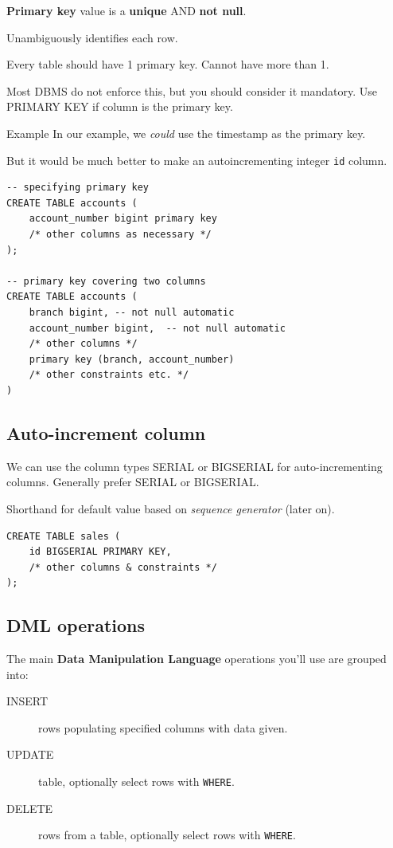 \documentclass[slides]{pgnotes}
\begin{document}
\textbf{Primary key} value is a \textbf{unique} AND \textbf{not null}.

Unambiguously identifies each row.

Every table should have 1 primary key.
Cannot have more than 1. 

Most DBMS do not enforce this, but you should consider it mandatory.
Use PRIMARY KEY if column is the primary key. 

\begin{greenbox}{Example}
  In our example, we \textit{could} use the timestamp as the primary key.

  But it would be much better to make an autoincrementing integer \texttt{id} column.
\end{greenbox}

\newpage

\begin{verbatim}
-- specifying primary key
CREATE TABLE accounts ( 
    account_number bigint primary key
    /* other columns as necessary */
);

-- primary key covering two columns
CREATE TABLE accounts (
    branch bigint, -- not null automatic
    account_number bigint,  -- not null automatic
    /* other columns */
    primary key (branch, account_number)
    /* other constraints etc. */
)
\end{verbatim}

\subsection{Auto-increment column}
\label{sec:auto-increment-column}

We can use the column types SERIAL or BIGSERIAL for auto-incrementing columns.
Generally prefer SERIAL or BIGSERIAL.

Shorthand for default value based on \textit{sequence generator} (later on).

\begin{verbatim}
CREATE TABLE sales ( 
    id BIGSERIAL PRIMARY KEY,
    /* other columns & constraints */
);
\end{verbatim}


\subsection{DML operations}

The main \textbf{Data Manipulation Language} operations you'll use are grouped into:

\begin{description}
\item[INSERT]
  rows populating specified columns with data given.
\item[UPDATE]
  table, optionally select rows with \texttt{WHERE}.
\item[DELETE]
  rows from a table, optionally select rows with \texttt{WHERE}.
\end{description}
\end{document}
